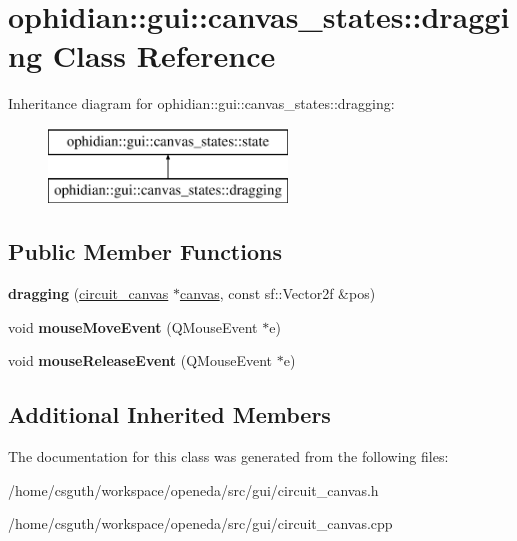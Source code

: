 \hypertarget{classophidian_1_1gui_1_1canvas__states_1_1dragging}{\section{ophidian\-:\-:gui\-:\-:canvas\-\_\-states\-:\-:dragging Class Reference}
\label{classophidian_1_1gui_1_1canvas__states_1_1dragging}
}
Inheritance diagram for ophidian\-:\-:gui\-:\-:canvas\-\_\-states\-:\-:dragging\-:\begin{figure}[H]
\begin{center}
\leavevmode
\includegraphics[height=2.000000cm]{classophidian_1_1gui_1_1canvas__states_1_1dragging}
\end{center}
\end{figure}
\subsection*{Public Member Functions}
\begin{DoxyCompactItemize}
\item 
\hypertarget{classophidian_1_1gui_1_1canvas__states_1_1dragging_a7b5135cf861cf5b2a4db7961db270798}{{\bfseries dragging} (\hyperlink{classophidian_1_1gui_1_1circuit__canvas}{circuit\-\_\-canvas} $\ast$\hyperlink{classophidian_1_1gui_1_1canvas}{canvas}, const sf\-::\-Vector2f \&pos)}\label{classophidian_1_1gui_1_1canvas__states_1_1dragging_a7b5135cf861cf5b2a4db7961db270798}

\item 
\hypertarget{classophidian_1_1gui_1_1canvas__states_1_1dragging_a622b13b9b78e3de07c723ff8b5b9a486}{void {\bfseries mouse\-Move\-Event} (Q\-Mouse\-Event $\ast$e)}\label{classophidian_1_1gui_1_1canvas__states_1_1dragging_a622b13b9b78e3de07c723ff8b5b9a486}

\item 
\hypertarget{classophidian_1_1gui_1_1canvas__states_1_1dragging_a82dae3b6eb3a21b75efdfa03e64e5bbc}{void {\bfseries mouse\-Release\-Event} (Q\-Mouse\-Event $\ast$e)}\label{classophidian_1_1gui_1_1canvas__states_1_1dragging_a82dae3b6eb3a21b75efdfa03e64e5bbc}

\end{DoxyCompactItemize}
\subsection*{Additional Inherited Members}


The documentation for this class was generated from the following files\-:\begin{DoxyCompactItemize}
\item 
/home/csguth/workspace/openeda/src/gui/circuit\-\_\-canvas.\-h\item 
/home/csguth/workspace/openeda/src/gui/circuit\-\_\-canvas.\-cpp\end{DoxyCompactItemize}
